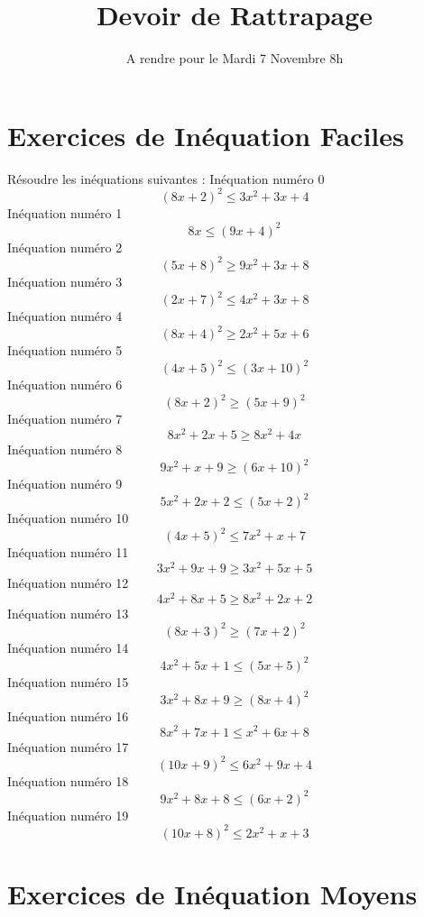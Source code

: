 \documentclass{article}
\title{Devoir de Rattrapage}
\date{A rendre pour le Mardi 7 Novembre 8h}\usepackage{natbib}
\begin{document}
\maketitle
 \section{Exercices de In\'equation Faciles}

 R\'esoudre les in\'equations suivantes : 
In\'equation num\'ero 0 \[\left(8 x + 2\right)^{2} \leq 3 x^{2} + 3 x + 4\]In\'equation num\'ero 1 \[8 x \leq \left(9 x + 4\right)^{2}\]In\'equation num\'ero 2 \[\left(5 x + 8\right)^{2} \geq 9 x^{2} + 3 x + 8\]In\'equation num\'ero 3 \[\left(2 x + 7\right)^{2} \leq 4 x^{2} + 3 x + 8\]In\'equation num\'ero 4 \[\left(8 x + 4\right)^{2} \geq 2 x^{2} + 5 x + 6\]In\'equation num\'ero 5 \[\left(4 x + 5\right)^{2} \leq \left(3 x + 10\right)^{2}\]In\'equation num\'ero 6 \[\left(8 x + 2\right)^{2} \geq \left(5 x + 9\right)^{2}\]In\'equation num\'ero 7 \[8 x^{2} + 2 x + 5 \geq 8 x^{2} + 4 x\]In\'equation num\'ero 8 \[9 x^{2} + x + 9 \geq \left(6 x + 10\right)^{2}\]In\'equation num\'ero 9 \[5 x^{2} + 2 x + 2 \leq \left(5 x + 2\right)^{2}\]In\'equation num\'ero 10 \[\left(4 x + 5\right)^{2} \leq 7 x^{2} + x + 7\]In\'equation num\'ero 11 \[3 x^{2} + 9 x + 9 \geq 3 x^{2} + 5 x + 5\]In\'equation num\'ero 12 \[4 x^{2} + 8 x + 5 \geq 8 x^{2} + 2 x + 2\]In\'equation num\'ero 13 \[\left(8 x + 3\right)^{2} \geq \left(7 x + 2\right)^{2}\]In\'equation num\'ero 14 \[4 x^{2} + 5 x + 1 \leq \left(5 x + 5\right)^{2}\]In\'equation num\'ero 15 \[3 x^{2} + 8 x + 9 \geq \left(8 x + 4\right)^{2}\]In\'equation num\'ero 16 \[8 x^{2} + 7 x + 1 \leq x^{2} + 6 x + 8\]In\'equation num\'ero 17 \[\left(10 x + 9\right)^{2} \leq 6 x^{2} + 9 x + 4\]In\'equation num\'ero 18 \[9 x^{2} + 8 x + 8 \leq \left(6 x + 2\right)^{2}\]In\'equation num\'ero 19 \[\left(10 x + 8\right)^{2} \leq 2 x^{2} + x + 3\]
 \section{Exercices de In\'equation Moyens}
\end{document}
